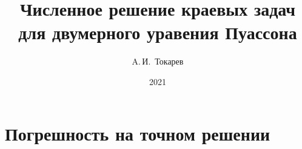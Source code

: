 \documentclass[12pt, a4paper]{article}
\title{Численное решение краевых задач для двумерного уравения Пуассона}
\author{A.\,И.~Токарев}
\date{2021}
\newcommand{\Picture}[4]
{
\begin{figure}[H]
\noindent 
\centering\texttt{[image: pic/\#1]}
\caption{#3}
\label{#4}
\end{figure}
}
\begin{document}
\maketitle
\tableofcontents 
\newpage

\section{Погрешность на точном решении}


\[
\]





\newpage
\end{document}

